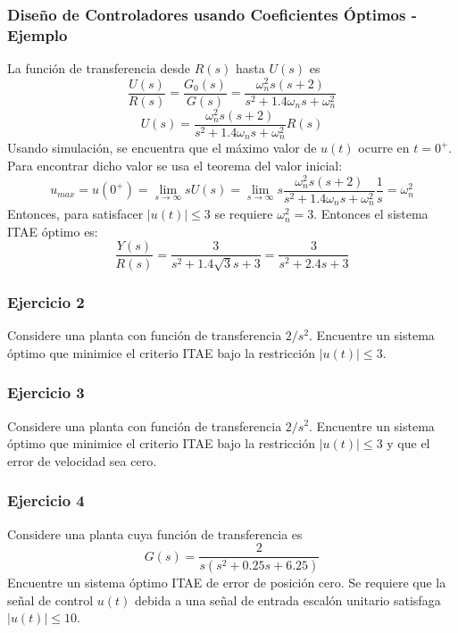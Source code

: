 \documentclass[aspectratio=169,handout]{beamer}
\theoremstyle{definition}
\theoremstyle{plain}
\theoremstyle{remark}
\begin{document}
\begin{frame}[<+->]\frametitle{Diseño de Controladores usando Coeficientes Óptimos - Ejemplo}
La función de transferencia desde $R(s)$ hasta $U(s)$ es
\begin{equation*}
	\frac{U(s)}{R(s)} = \frac{G_0(s)}{G(s)} = \frac{\omega_n^2 s (s+2)}{s^2 + 1.4 \omega_n s + \omega_n^2}
\end{equation*}
\begin{equation*}
	U(s) = \frac{\omega_n^2 s (s+2)}{s^2 + 1.4 \omega_n s + \omega_n^2} R(s)
\end{equation*}
Usando simulación, se encuentra que el máximo valor de $u(t)$ ocurre en $t = 0^+$. Para encontrar dicho valor se usa el teorema del valor inicial:
\begin{equation*}
	u_{max} = u(0^+) = \lim_{s \rightarrow \infty} s U(s) = \lim_{s \rightarrow \infty} s \frac{\omega_n^2 s (s+2)}{s^2 + 1.4 \omega_n s + \omega_n^2} \frac{1}{s} = \omega_n^2
\end{equation*}
Entonces, para satisfacer $|u(t)| \leq 3$ se requiere $\omega_n^2 = 3$. Entonces el sistema ITAE óptimo es:
\begin{equation*}
	\frac{Y(s)}{R(s)} = \frac{3}{s^2 + 1.4 \sqrt{3} s + 3} = \frac{3}{s^2 + 2.4 s + 3} 
\end{equation*}
\end{frame}

\begin{frame}[c]\frametitle{Ejercicio 2}
Considere una planta con función de transferencia $2/s^2$. Encuentre un sistema óptimo que minimice el criterio ITAE bajo la restricción $|u(t)| \leq 3$.
\end{frame}

\begin{frame}[c]\frametitle{Ejercicio 3}
Considere una planta con función de transferencia $2/s^2$. Encuentre un sistema óptimo que minimice el criterio ITAE bajo la restricción $|u(t)| \leq 3$ y que el error de velocidad sea cero.
\end{frame}

\begin{frame}[c]\frametitle{Ejercicio 4}
Considere una planta cuya función de transferencia es
\begin{equation*}
	G(s) = \frac{2}{s(s^2 + 0.25s + 6.25)}
\end{equation*}
Encuentre un sistema óptimo ITAE de error de posición cero. Se requiere que la señal de control $u(t)$ debida a una señal de entrada escalón unitario satisfaga $|u(t)| \leq 10$.
\end{frame}
\end{document}
